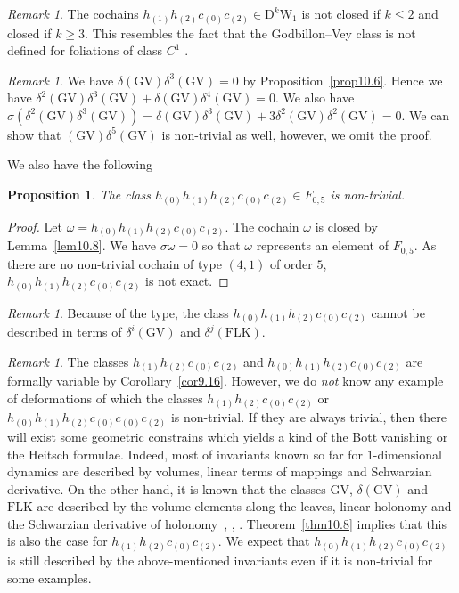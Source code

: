 \documentclass[12pt]{amsart}
\newcommand{\GV}{\mathrm{GV}}
\newcommand{\FLK}{\mathrm{FLK}}
\newcommand{\W}{\mathrm{W}}
\newcommand{\D}{\mathrm{D}}
\newtheorem{proposition}[theorem]{Proposition}
\theoremstyle{definition}
\theoremstyle{remark}
\newtheorem{remark}[theorem]{Remark}
\begin{document}
\begin{remark}
The cochains $h_{(1)}h_{(2)}c_{(0)}c_{(2)}\in\D^k\W_1$ is not closed if $k\leq2$ and closed if $k\geq3$.
This resembles the fact that the Godbillon--Vey class is not defined for foliations of class $C^1$ \cite{Tsuboi}.
\end{remark}

\begin{remark}
We have $\delta(\GV)\delta^3(\GV)=0$ by Proposition~\ref{prop10.6}.
Hence we have $\delta^2(\GV)\delta^3(\GV)+\delta(\GV)\delta^4(\GV)=0$.
We also have $\sigma(\delta^2(\GV)\delta^3(\GV))=\delta(\GV)\delta^3(\GV)+3\delta^2(\GV)\delta^2(\GV)=0$.
We can show that $(\GV)\delta^5(\GV)$ is non-trivial as well, however, we omit the proof.
\end{remark}

We also have the following

\begin{proposition}
\label{prop10.2}
The class $h_{(0)}h_{(1)}h_{(2)}c_{(0)}c_{(2)}\in F_{0,5}$ is non-trivial.
\end{proposition}
\begin{proof}
Let $\omega=h_{(0)}h_{(1)}h_{(2)}c_{(0)}c_{(2)}$.
The cochain $\omega$ is closed by Lemma~\ref{lem10.8}.
We have $\sigma\omega=0$ so that $\omega$ represents an element of $F_{0,5}$.
As there are no non-trivial cochain of type $(4,1)$ of order $5$, $h_{(0)}h_{(1)}h_{(2)}c_{(0)}c_{(2)}$ is not exact.
\end{proof}

\begin{remark}
Because of the type, the class $h_{(0)}h_{(1)}h_{(2)}c_{(0)}c_{(2)}$ cannot be described in terms of $\delta^i(\GV)$ and $\delta^j(\FLK)$.
\end{remark}

\begin{remark}
The classes $h_{(1)}h_{(2)}c_{(0)}c_{(2)}$ and $h_{(0)}h_{(1)}h_{(2)}c_{(0)}c_{(2)}$ are formally variable by Corollary~\ref{cor9.16}.
However, we do \textit{not} know any example of deformations of which the classes $h_{(1)}h_{(2)}c_{(0)}c_{(2)}$ or $h_{(0)}h_{(1)}h_{(2)}c_{(0)}c_{(0)}c_{(2)}$ is non-trivial.
If they are always trivial, then there will exist some geometric constrains which yields a kind of the Bott vanishing or the Heitsch formulae.
Indeed, most of invariants known so far for $1$-dimensional dynamics are described by volumes, linear terms of mappings and Schwarzian derivative.
On the other hand, it is known that the classes $\GV$, $\delta(\GV)$ and $\FLK$ are described by the volume elements along the leaves, linear holonomy and the Schwarzian derivative of holonomy~\cite{asuke:tohoku}, \cite{asuke:Tohoku2017}, \cite{asuke:FLK}.
Theorem~\ref{thm10.8} implies that this is also the case for $h_{(1)}h_{(2)}c_{(0)}c_{(2)}$.
We expect that $h_{(0)}h_{(1)}h_{(2)}c_{(0)}c_{(2)}$ is still described by the above-mentioned invariants even if it is non-trivial for some examples.
\end{remark}
\end{document}
